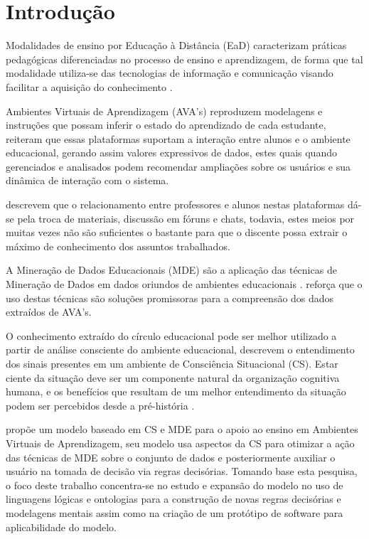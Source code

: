 \documentclass[
	oneside,
	12pt,				%
	a4paper,			%
	english,			%
	brazil,				%
	article
	]{abntex2}
\begin{document}
\section{Introdução}

Modalidades de ensino por Educação à Distância (EaD) caracterizam práticas pedagógicas diferenciadas no processo de ensino e aprendizagem, de forma que tal modalidade utiliza-se das tecnologias de informação e comunicação visando facilitar a aquisição do conhecimento \cite{Rabelo_et_al2017}.

Ambientes Virtuais de Aprendizagem (AVA’s) reproduzem modelagens e instruções que possam inferir o estado do aprendizado de cada estudante,  reiteram que essas plataformas suportam a interação entre alunos e o ambiente educacional, gerando assim valores expressivos de dados, estes quais quando gerenciados e analisados podem recomendar ampliações sobre os usuários e sua dinâmica de interação com o sistema.

 descrevem que o relacionamento entre professores e alunos nestas plataformas dá-se pela troca de materiais, discussão em fóruns e chats, todavia, estes meios por muitas vezes não são suficientes o bastante para que o discente possa extrair o máximo de conhecimento dos assuntos trabalhados.

A Mineração de Dados Educacionais (MDE) são a aplicação das técnicas de Mineração de Dados em dados oriundos de ambientes educacionais \cite{Romero_Ventura_2013}.  reforça que o uso destas técnicas são soluções promissoras para a compreensão dos dados extraídos de AVA's. 

O conhecimento extraído do círculo educacional pode ser melhor utilizado a partir de análise consciente do ambiente educacional,  descrevem o entendimento dos sinais presentes em um ambiente de Consciência Situacional (CS). Estar ciente da situação deve ser um componente natural da organização cognitiva humana, e os benefícios que resultam de um melhor entendimento da situação podem ser percebidos desde a pré-história \cite{Roy_Breton_Rousseau_2007}.

 propõe um modelo baseado em CS e MDE para o apoio ao ensino em Ambientes Virtuais de Aprendizagem, seu modelo usa aspectos da CS para otimizar a ação das técnicas de MDE sobre o conjunto de dados e posteriormente auxiliar o usuário na tomada de decisão via regras decisórias. Tomando base esta pesquisa, o foco deste trabalho concentra-se no estudo e expansão do modelo no uso de linguagens lógicas e ontologias para a construção de novas regras decisórias e modelagens mentais assim como na criação de um protótipo de software para aplicabilidade do modelo.
\end{document}
